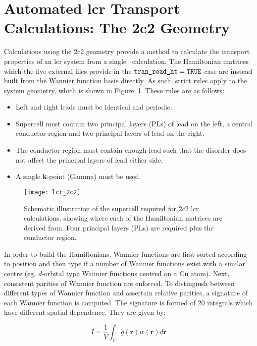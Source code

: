\section{Automated lcr Transport Calculations: The 2c2 Geometry}
\label{sec:2c2}

Calculations using the 2c2 geometry provide a method to calculate the
transport properties of an lcr system from a single \wannier\ calculation.
The Hamiltonian matrices which the five external files provide in the
$\verb#tran_read_ht#=\verb#TRUE#$ case are instead built from the
Wannier function basis directly. As such, strict rules apply to the system geometry,
which is shown in Figure~\ref{fig:2c2}. These rules are as follows:
\begin{itemize}
\item Left and right leads must be identical and periodic.
\item Supercell must contain two principal layers (PLs) of lead on the left,
a central conductor region and two principal layers of lead on the right.
\item The conductor region must contain enough lead such that the
disorder does not affect the principal layers of lead either side.
\item A single \textbf{k}-point (Gamma) must be used.
\end{itemize}

\begin{figure}[h]
\centering
\texttt{[image: lcr\_2c2]}
\caption{Schematic illustration of the supercell required for 2c2
lcr calculations, showing where each of the Hamiltonian matrices
are derived from. Four principal layers (PLs) are required plus the
conductor region.}
\label{fig:2c2}
\end{figure}

In order to build the Hamiltonians, Wannier  functions are first
sorted according to position and then type if a number of Wannier
functions exist with a similar centre (eg. \emph{d}-orbital type Wannier
functions centred on a Cu atom). Next, consistent parities of Wannier
function are enforced. To distingiush between different types of Wannier function
and assertain relative parities, a signature of each Wannier function
is computed. The signature is formed of 20 integrals which have
different spatial dependence. They are given by:

\begin{equation}
I=\frac{1}{V}\int_V g(\mathbf{r})w(\mathbf{r})d\mathbf{r}
\label{eq:sig_ints}
\end{equation}

